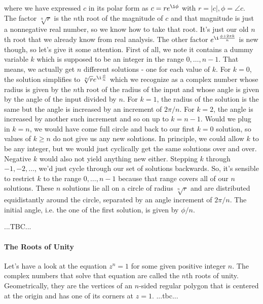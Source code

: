 where we have expressed $c$ in its polar form as $c = r e^{\i \phi}$ with $r = |c|, \phi = \angle c$. The factor $\sqrt[n]{r}$ is the $n$th root of the magnitude of $c$ and that magnitude is just a nonnegative real number, so we know how to take that root. It's just our old $n$th root that we already know from real analysis. The other factor $e^{\i \frac{\phi + 2 \pi k}{n}}$ is new though, so let's give it some attention. First of all, we note it contains a dummy variable $k$ which is supposed to be an integer in the range $0,\ldots,n-1$. That means, we actually get $n$ different solutions - one for each value of $k$. For $k = 0$, the solution simplifies to $\sqrt[n]{r} e^{\i \frac{\phi}{n}}$ which we recognize as a complex number whose radius is given by the $n$th root of the radius of the input and whose angle is given by the angle of the input divided by $n$. For $k=1$, the radius of the solution is the same but the angle is increased by an increment of $2\pi / n$. For $k=2$, the angle is increased by another such increment and so on up to $k=n-1$. Would we plug in $k=n$, we would have come full circle and back to our first $k=0$ solution, so values of $k \geq n$ do not give us any new solutions. In principle, we could allow $k$ to be any integer, but we would just cyclically get the same solutions over and over. Negative $k$ would also not yield anything new either. Stepping $k$ through $-1,-2,\ldots$, we'd just cycle through our set of solutions backwards. So, it's sensible to restrict $k$ to the range $0,\ldots,n-1$ because that range covers all of our $n$ solutions. These $n$ solutions lie all on a circle of radius $\sqrt[n]{r}$ and are distributed equidistantly around the circle, separated by an angle increment of $2 \pi / n$. The initial angle, i.e. the one of the first solution, is given by $\phi / n$.

\medskip


%
...TBC...


\paragraph{The Roots of Unity}
Let's have a look at the equation $z^n = 1$ for some given positive integer $n$. The complex numbers that solve that equation are called the $n$th roots of unity. Geometrically, they are the vertices of an $n$-sided regular polygon that is centered at the origin and has one of its corners at $z = 1$. ...tbc...

